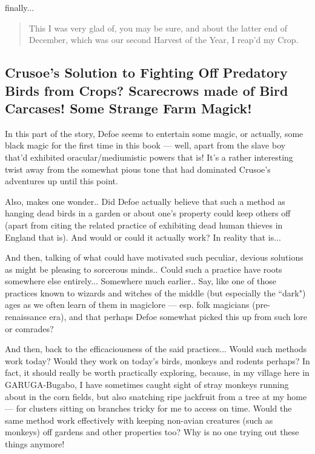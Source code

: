 \documentclass[a4paper]{article}
\begin{document}
finally...



\noindent
\begin{minipage}{1\textwidth}
\vspace{1em}
\begin{quotation}
{\ttfamily


This I was very glad of, you may be sure, and about the latter end of December, which was our second Harvest of the Year, I reap’d my Crop.


}
\end{quotation}
\vspace{1em}
\end{minipage}


\subsection{Crusoe's Solution to Fighting Off Predatory Birds from Crops? Scarecrows made of Bird Carcases! Some Strange Farm Magick!}


In this part of the story, Defoe seems to entertain some magic, or actually, some black magic for the first time in this book --- well, apart from the slave boy that'd exhibited oracular/mediumistic powers that is! It's a rather interesting twist away from the somewhat pious tone that had dominated Crusoe's adventures up until this point. 

Also, makes one wonder.. Did Defoe actually believe that such a method as hanging dead birds in a garden or about one's property could keep others off (apart from citing the related practice of exhibiting dead human thieves in England that is). And would or could it actually work? In reality that is...

And then, talking of what could have motivated such peculiar, devious solutions as might be pleasing to sorcerous minds.. Could such a practice have roots somewhere else entirely... Somewhere much earlier.. Say, like one of those practices known to wizards and witches of the middle (but especially the ``dark") ages as we often learn of them in magiclore --- esp. folk magicians  (pre-renaissance era), and that perhaps Defoe somewhat picked this up from such lore or comrades? 

And then, back to the efficaciousness of the said practices... Would such methods work today? Would they work on today's birds, monkeys and rodents perhaps? In fact, it should really be worth practically exploring, because, in my village here in GARUGA-Bugabo, I have sometimes caught sight of stray monkeys running about in the corn fields, but also snatching ripe jackfruit from a tree at my home --- for clusters sitting on branches tricky for me to access on time. Would the same method work effectively with keeping non-avian creatures (such as monkeys) off gardens and other properties too? Why is no one trying out these things anymore!
\end{document}
